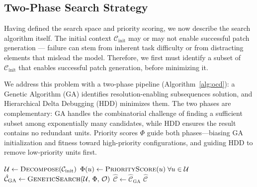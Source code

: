 \documentclass[sigconf,nonacm]{acmart}
\begin{document}
\subsection{Two-Phase Search Strategy}
\label{sec:search_strategy}

Having defined the search space and priority scoring, we now describe the search algorithm itself. The initial context $\mathcal{C}_\mathrm{init}$ may or may not enable successful patch generation --- failure can stem from inherent task difficulty or from distracting elements that mislead the model. Therefore, we first must identify a subset of $\mathcal{C}_\mathrm{init}$ that enables successful patch generation, before minimizing it.

We address this problem with a two-phase pipeline (Algorithm~\ref{alg:ocd}): a Genetic Algorithm (GA) identifies resolution-enabling subsequences solution, and Hierarchical Delta Debugging (HDD) minimizes them. The two phases are complementary: GA handles the combinatorial challenge of finding a sufficient subset among exponentially many candidates, while HDD ensures the result contains no redundant units. Priority scores $\Phi$ guide both phases---biasing GA initialization and fitness toward high-priority configurations, and guiding HDD to remove low-priority units first.

\begin{algorithm}[t]
\caption{Oracle-Guided Context Distillation}
\label{alg:ocd}
$\mathcal{U} \leftarrow \textsc{Decompose}(\mathcal{C}_\mathrm{init})$
$\Phi(u) \leftarrow \textsc{PriorityScore}(u)\;\forall u \in \mathcal{U}$
  \tcp*{\S\ref{sec:priority}}
\BlankLine
{}
$\hat{\mathcal{C}}_{\mathrm{GA}} \leftarrow \textsc{GeneticSearch}(\mathcal{U},\, \Phi,\, \mathcal{O})$\;
\BlankLine
{}
$\hat{\mathcal{C}} \leftarrow \hat{\mathcal{C}}_{\mathrm{GA}}$\;
\Return $\hat{\mathcal{C}}$\;
\end{algorithm}
\end{document}
